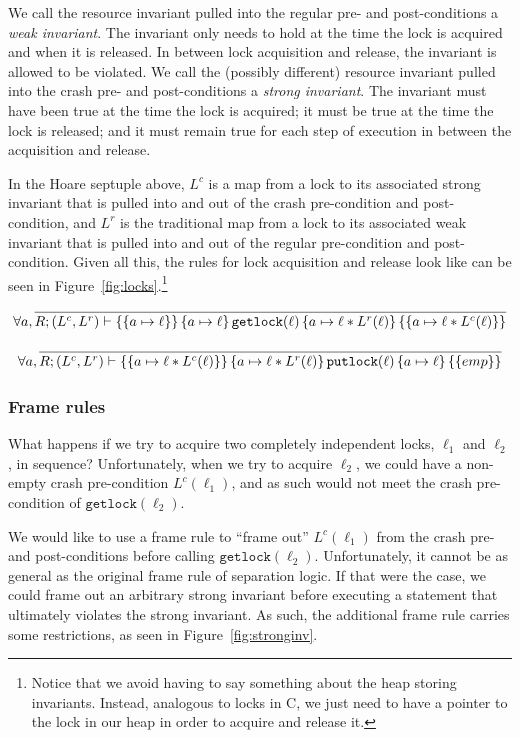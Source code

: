 We call the resource invariant pulled into the regular pre- and post-conditions
a \textit{weak invariant}. The invariant only needs to hold at the time the lock
is acquired and when it is released. In between lock acquisition and release,
the invariant is allowed to be violated. We call the (possibly different) resource
invariant pulled into the crash pre- and post-conditions a \textit{strong
invariant}. The invariant must have been true at the time the lock is acquired;
it must be true at the time the lock is released; and it must remain true for
each step of execution in between the acquisition and release.

In the Hoare septuple above, $L^c$ is a map from a lock to its associated strong
invariant that is pulled into and out of the crash pre-condition and
post-condition, and $L^r$ is the traditional map from a lock to its associated
weak invariant that is pulled into and out of the regular pre-condition and
post-condition. Given all this, the rules for lock acquisition and release look
like can be seen in Figure~\ref{fig:locks}.\footnote{Notice that we avoid having to say something about the heap
storing invariants. Instead, analogous to locks in C, we just need to have a
pointer to the lock in our heap in order to acquire and release it.}

\begin{figure*}
\begin{gather*}
    \forall a, \infer{\hoarestmt{R}{(L^c,L^r)}{a \mapsto \ell}{a \mapsto \ell}{\texttt{getlock}(\ell)}{a \mapsto \ell *
    L^r(\ell)}{a \mapsto \ell * L^c(\ell)}}{} \\[+9px]
    \forall a, \infer{\hoarestmt{R}{(L^c,L^r)}{a \mapsto \ell * L^c(\ell)}{a \mapsto \ell *
    L^r(\ell)}{\texttt{putlock}(\ell)}{a \mapsto \ell}{emp}}{}
\end{gather*}
\caption{Rules for getlock and putlock}
\label{fig:locks}
\end{figure*}

\subsubsection{Frame rules}

What happens if we try to acquire two completely independent locks, $\ell_1$ and
$\ell_2$, in sequence? Unfortunately, when we try to acquire $\ell_2$, we could have a
non-empty crash pre-condition $L^c(\ell_1)$, and as such would not meet the
crash pre-condition of $\texttt{getlock}(\ell_2)$.

We would like to use a frame rule to ``frame out'' $L^c(\ell_1)$ from the crash
pre- and post-conditions before calling $\texttt{getlock}(\ell_2)$.
Unfortunately, it cannot be as general as the original frame rule of separation
logic. If that were the case, we could frame out an arbitrary strong invariant
before executing a statement that ultimately violates the strong invariant. As
such, the additional frame rule carries some restrictions, as seen in
Figure~\ref{fig:stronginv}.

